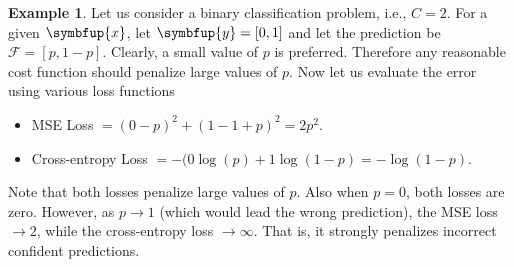 \documentclass[11pt]{extarticle}
\newcommand{\ds}{\displaystyle}
\newcommand{\vx}{\symbfup{x}}
\newcommand{\vy}{\symbfup{y}}
\theoremstyle{definition}
\newtheorem{example}{Example}%
\begin{document}
\begin{example}\label{ex:cr_ent}
  Let us consider a binary classification problem, i.e., $C=2$. For a given $\vx$, let $\vy = [0,1]$ and let the prediction be $\mathcal{F} = [p, 1-p]$. Clearly, a small value of $p$ is preferred. Therefore any reasonable cost function should penalize large values of $p$. Now let us evaluate the error using various loss functions
\begin{itemize}
  \item MSE Loss $\ds= (0-p)^2 + (1 - 1 +p)^2 = 2p^2$.
  \item Cross-entropy Loss $\ds= -(0 \log(p) + 1 \log(1-p) = - \log(1-p)$.
\end{itemize}
Note that both losses penalize large values of $p$. Also when $p = 0$, both losses are zero. However, as $p \to 1$ (which would lead the wrong prediction), the MSE loss $\to 2$, while the cross-entropy loss $\to \infty$. That is, it strongly penalizes incorrect confident predictions. 
\end{example}



\end{document}
